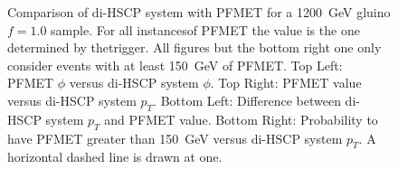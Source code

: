 \begin{figure}
\begin{center}
      \caption[Comparison of di-HSCP system $\phi$ and \pt\ with PFMET for a 1200~GeV 
gluino $f=1.0$ sample in events with at least 150~GeV of PFMET.]
              {Comparison of di-HSCP system with PFMET for a 1200~GeV gluino $f=1.0$ sample. For all instancesof PFMET the value is the one determined by thetrigger.
		All figures but the bottom right one only consider events with at least 150~GeV of PFMET. 
         Top Left: PFMET $\phi$ versus di-HSCP system $\phi.$ Top Right: PFMET value versus di-HSCP system $p_T$. 
         Bottom Left: Difference between di-HSCP system $p_T$ and PFMET value.
         Bottom Right: Probability to have PFMET greater than 150~GeV versus di-HSCP system $p_T$. A horizontal dashed line is drawn at one.
        }
      \label{fig:SystPtTrigger}
  \end{center}
\end{figure}

